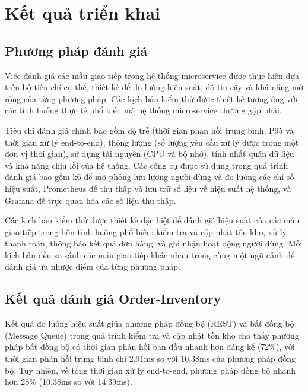 \section{Kết quả triển khai}

\subsection{Phương pháp đánh giá}
Việc đánh giá các mẫu giao tiếp trong hệ thống microservice được thực hiện dựa trên bộ tiêu chí cụ thể, thiết kế để đo lường hiệu suất, độ tin cậy và khả năng mở rộng của từng phương pháp. Các kịch bản kiểm thử được thiết kế tương ứng với các tình huống thực tế phổ biến mà hệ thống microservice thường gặp phải.

Tiêu chí đánh giá chính bao gồm độ trễ (thời gian phản hồi trung bình, P95 và thời gian xử lý end-to-end), thông lượng (số lượng yêu cầu xử lý được trong một đơn vị thời gian), sử dụng tài nguyên (CPU và bộ nhớ), tính nhất quán dữ liệu và khả năng chịu lỗi của hệ thống. Các công cụ được sử dụng trong quá trình đánh giá bao gồm k6 để mô phỏng lưu lượng người dùng và đo lường các chỉ số hiệu suất, Prometheus để thu thập và lưu trữ số liệu về hiệu suất hệ thống, và Grafana để trực quan hóa các số liệu thu thập.

Các kịch bản kiểm thử được thiết kế đặc biệt để đánh giá hiệu suất của các mẫu giao tiếp trong bốn tình huống phổ biến: kiểm tra và cập nhật tồn kho, xử lý thanh toán, thông báo kết quả đơn hàng, và ghi nhận hoạt động người dùng. Mỗi kịch bản đều so sánh các mẫu giao tiếp khác nhau trong cùng một ngữ cảnh để đánh giá ưu nhược điểm của từng phương pháp.

\subsection{Kết quả đánh giá Order-Inventory}
Kết quả đo lường hiệu suất giữa phương pháp đồng bộ (REST) và bất đồng bộ (Message Queue) trong quá trình kiểm tra và cập nhật tồn kho cho thấy phương pháp bất đồng bộ có thời gian phản hồi ban đầu nhanh hơn đáng kể (72\%), với thời gian phản hồi trung bình chỉ 2.91ms so với 10.38ms của phương pháp đồng bộ. Tuy nhiên, về tổng thời gian xử lý end-to-end, phương pháp đồng bộ nhanh hơn 28\% (10.38ms so với 14.39ms).

